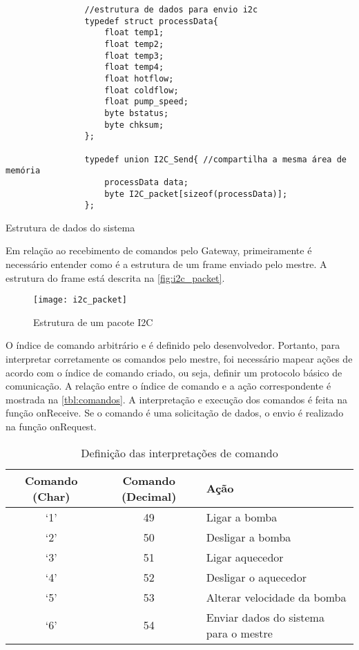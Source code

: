 			\begin{listing}[!htb]
				\begin{verbatim}
				//estrutura de dados para envio i2c
				typedef struct processData{
					float temp1;
					float temp2;
					float temp3;
					float temp4;
					float hotflow;
					float coldflow;
					float pump_speed;
					byte bstatus;
					byte chksum;
				};
				
				typedef union I2C_Send{ //compartilha a mesma área de memória
					processData data;
					byte I2C_packet[sizeof(processData)];
				};				
				\end{verbatim}
				\caption{Estrutura de dados do sistema}
				\label{cod:dadosi2c}
			\end{listing}
			
			Em relação ao recebimento de comandos pelo Gateway, primeiramente é necessário entender como é a estrutura de um frame enviado pelo mestre. A estrutura do frame está descrita na \autoref{fig:i2c_packet}.
			
			\begin{figure}[!htb]	
				\captionsetup{justification=centering}
				\begin{center}
					\texttt{[image: i2c\_packet]}  %
					\caption[Estrutura de um pacote I2C]{\label{fig:i2c_packet}Estrutura de um pacote I2C}
				\end{center}		
			\end{figure}
		
			O índice de comando arbitrário e é definido pelo desenvolvedor. Portanto, para interpretar corretamente os comandos pelo mestre, foi necessário mapear ações de acordo com o índice de comando criado, ou seja, definir um protocolo básico de comunicação. A relação entre o índice de comando e a ação correspondente é mostrada na \autoref{tbl:comandos}. A interpretação e execução dos comandos é feita na função onReceive. Se o comando é uma solicitação de dados, o envio é realizado na função onRequest.
			
			\begin{table}[!htb]
				\centering
				\caption{Definição das interpretações de comando}
				\label{tbl:comandos}
				\def\arraystretch{1.3}
				\begin{tabular}{c c l}
					\hline
					\textbf{Comando (Char)} & \textbf{Comando (Decimal)} & \textbf{Ação}  \\ \hline
					
					`1' & 49 & Ligar a bomba \\ %
					`2' & 50 & Desligar a bomba \\ %
					`3' & 51 & Ligar aquecedor \\ %
					`4' & 52 & Desligar o aquecedor \\ %
					`5' & 53 & Alterar velocidade da bomba \\
					`6' & 54 & Enviar dados do sistema para o mestre \\ %
					\hline
				\end{tabular}
			\end{table}
		
